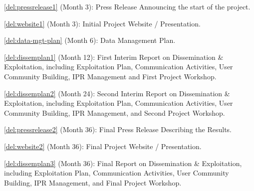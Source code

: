 \begin{Workpackage}{\thewpno}
\begin{WPDeliverables}
\begin{compactitem}
\item \ref{del:pressrelease1} (Month 3): Press Release Announcing the start of the \TheProject{} project.
\item \ref{del:website1} (Month 3): Initial Project Website / Presentation.
\item \ref{del:data-mgt-plan} (Month 6): Data Management Plan.
\item \ref{del:dissemplan1} (Month 12): First Interim Report on Dissemination \& Exploitation, including Exploitation Plan, Communication Activities, User Community Building, IPR Management and First Project Workshop.
\item \ref{del:dissemplan2} (Month 24): Second Interim Report on Dissemination \& Exploitation, including Exploitation Plan, Communication Activities, User Community Building, IPR Management, and Second Project Workshop.
\item \ref{del:pressrelease2} (Month 36): Final Press Release Describing the \TheProject{} Results.
\item \ref{del:website2} (Month 36): Final Project Website / Presentation.
\item \ref{del:dissemplan3} (Month 36): Final Report on Dissemination \& Exploitation, including Exploitation Plan, Communication Activities, User Community Building, IPR Management, and Final Project Workshop.\end{compactitem}
\end{WPDeliverables}
\end{Workpackage}

